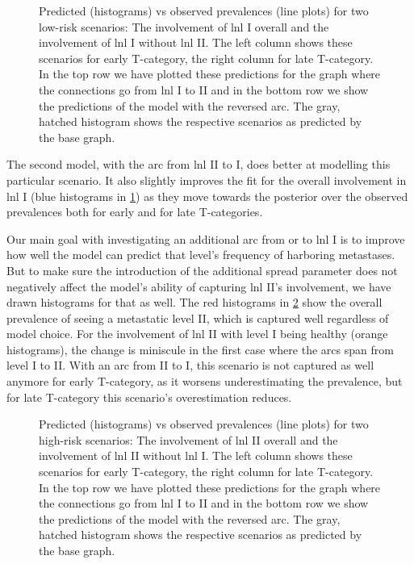 \documentclass[\relativeRoot/main.tex]{subfiles}
\begin{document}
\begin{figure}
    \centering
    \def\svgwidth{1.0\textwidth}
    
    \caption[
        Arc between LNL I \& II: Low prevalence comparisons
    ]{
        Predicted (histograms) vs observed prevalences (line plots) for two low-risk scenarios: The involvement of \gls{lnl} I overall and the involvement of \gls{lnl} I without \gls{lnl} II. The left column shows these scenarios for early T-category, the right column for late T-category. In the top row we have plotted these predictions for the graph where the connections go from \gls{lnl} I to II and in the bottom row we show the predictions of the model with the reversed arc. The gray, hatched histogram shows the respective scenarios as predicted by the base graph.
    }
    \label{fig:graph:extended:low12or21}
\end{figure}

The second model, with the arc from \gls{lnl} II to I, does better at modelling this particular scenario. It also slightly improves the fit for the overall involvement in \gls{lnl} I (blue histograms in \cref{fig:graph:extended:low12or21}) as they move towards the posterior over the observed prevalences both for early and for late T-categories.

Our main goal with investigating an additional arc from or to \gls{lnl} I is to improve how well the model can predict that level's frequency of harboring metastases. But to make sure the introduction of the additional spread parameter does not negatively affect the model's ability of capturing \gls{lnl} II's involvement, we have drawn histograms for that as well. The red histograms in \cref{fig:graph:extended:high12or21} show the overall prevalence of seeing a metastatic level II, which is captured well regardless of model choice. For the involvement of \gls{lnl} II with level I being healthy (orange histograms), the change is miniscule in the first case where the arcs span from level I to II. With an arc from II to I, this scenario is not captured as well anymore for early T-category, as it worsens underestimating the prevalence, but for late T-category this scenario's overestimation reduces.

\begin{figure}
    \centering
    \def\svgwidth{1.0\textwidth}
    
    \caption[
        Arc between LNL I \& II: High prevalence comparisons
    ]{
        Predicted (histograms) vs observed prevalences (line plots) for two high-risk scenarios: The involvement of \gls{lnl} II overall and the involvement of \gls{lnl} II without \gls{lnl} I. The left column shows these scenarios for early T-category, the right column for late T-category. In the top row we have plotted these predictions for the graph where the connections go from \gls{lnl} I to II and in the bottom row we show the predictions of the model with the reversed arc. The gray, hatched histogram shows the respective scenarios as predicted by the base graph.
    }
    \label{fig:graph:extended:high12or21}
\end{figure}
\end{document}

